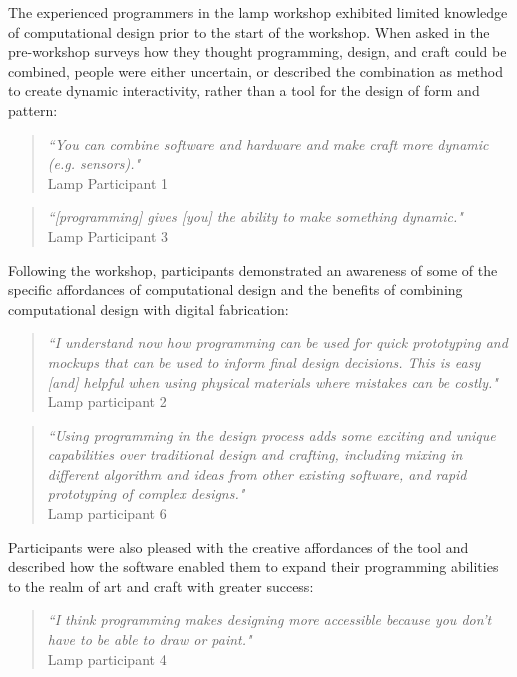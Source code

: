 The experienced programmers in the lamp workshop exhibited limited knowledge of computational design prior to the start of the workshop. When asked in the pre-workshop surveys how they thought programming, design, and craft could be combined, people were either uncertain, or described the combination as method to create dynamic interactivity, rather than a tool for the design of form and pattern:
\begin{quotation}
\textit{``You can combine software and hardware and make craft more dynamic (e.g. sensors)."}
 \\Lamp Participant 1
\end{quotation}
\begin{quotation}
\textit{``[programming] gives [you] the ability to make something dynamic."}
 \\Lamp Participant 3
\end{quotation}

Following the workshop, participants demonstrated an awareness of some of the specific affordances of computational design and the benefits of combining computational design with digital fabrication:
\begin{quotation}
\textit{``I understand now how programming can be used for quick prototyping and mockups that can be used to inform final design decisions. This is easy [and] helpful when using physical materials where mistakes can be costly."}
\\Lamp participant  2
\end{quotation}

\begin{quotation}
\textit{``Using programming in the design process adds some exciting and unique capabilities over traditional design and crafting, including mixing in different algorithm and ideas from other existing software, and rapid prototyping of complex designs."}
\\Lamp participant 6
\end{quotation} 

Participants were also pleased with the creative affordances of the tool and described how the software enabled them to expand their programming abilities to the realm of art and craft with greater success: 
\begin{quotation}
\textit{``I think programming makes designing more accessible because you don't have to be able to draw or paint."}
\\Lamp participant 4
\end{quotation}

